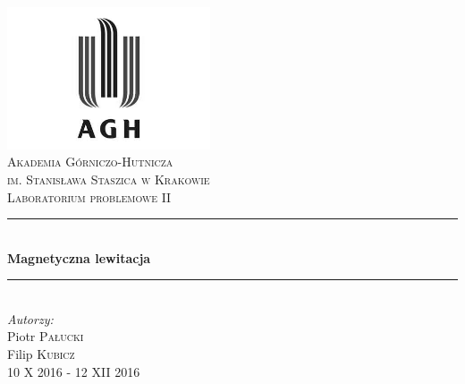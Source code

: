 \begin{titlepage}

\newcommand{\HRule}{\rule{\linewidth}{0.5mm}}

\center
 

\includegraphics[width=6cm]{../res/img/logo.png}\\[1cm]
 
 

\textsc{\LARGE Akademia Górniczo-Hutnicza \\[0.2cm]
im. Stanisława Staszica w Krakowie}\\[1.5cm]

\textsc{\Large Laboratorium problemowe II}\\[0.5cm]


\HRule \\[0.5cm]
{ \huge \bfseries Magnetyczna lewitacja}\\[0.3cm]
\HRule \\[1.5cm]

\flushright
\Large \emph{Autorzy:}\\
Piotr \textsc{Pałucki}\\[0.1cm]  %
Filip \textsc{Kubicz}\\[3cm]        %

10 X 2016 - 12 XII 2016


\vfill %

\end{titlepage}